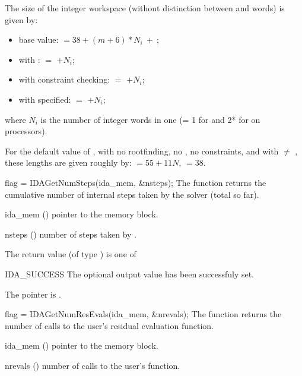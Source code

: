 {{  The size of the integer workspace (without distinction between  
  and  words) is given by:
  \begin{itemize}
  \item base value:  $= 38 + (m + 6)*N_i ~ + ~ $;  
  \item with :  $=$  $+ N_i$;
  \item with constraint checking:  $=$  $+ N_i$;
  \item with  specified:  $=$  $+ N_i$;
  \end{itemize}
  where $N_i$ is the number of integer words in one 
  (= 1 for {\nvecs} and 2* for {\nvecp} on  processors).

  For the default value of , with no rootfinding, no ,
  no constraints, and with  $\neq$ , these lengths are
  given roughly by:  $= 55 + 11N$,  $= 38$.
}
{
  flag = IDAGetNumSteps(ida\_mem, \&nsteps);
}
{
  The function  returns the cumulative number of internal 
  steps taken by the solver (total so far).
}
{
  \begin{args}
  \item[ida\_mem] ()
    pointer to the {\ida} memory block.
  \item[nsteps] ()
    number of steps taken by {\ida}.
  \end{args}
}
{
  The return value  (of type ) is one of
  \begin{args}
  \item[IDA\_SUCCESS] 
    The optional output value has been successfuly set.
  \item[\Id{IDA\_MEM\_NULL}]
    The  pointer is .
  \end{args}
}
{}
{
  flag = IDAGetNumResEvals(ida\_mem, \&nrevals);
}
{
  The function  returns the 
  number of calls to the user's residual evaluation function.
}
{
  \begin{args}
  \item[ida\_mem] ()
    pointer to the {\ida} memory block.
  \item[nrevals] ()
    number of calls to the user's  function.
  \end{args}
}
}
